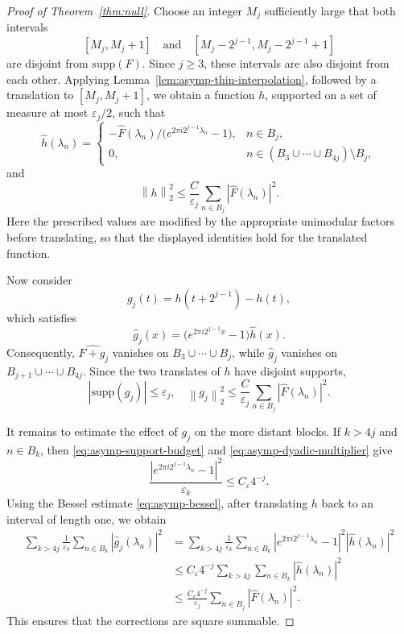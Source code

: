 \documentclass[10pt,a4paper]{amsart}
\newcommand{\norm}[1]{\left\lVert #1 \right\rVert}
\newcommand{\supp}{{\mathrm{supp}}}
\begin{document}
\begin{proof}[Proof of Theorem~\ref{thm:null}]
Choose an integer \(M_j\) sufficiently large that both intervals
\[
    [M_j,M_j+1]
    \quad\text{and}\quad
    [M_j-2^{j-1},M_j-2^{j-1}+1]
\]
are disjoint from \(\supp (F)\). Since \(j\ge3\), these intervals
are also disjoint from each other.
Applying Lemma~\ref{lem:asymp-thin-interpolation}, followed by a
translation to \([M_j,M_j+1]\), we obtain a function \(h\), supported
on a set of measure at most \(\varepsilon_j/2\), such that
\[
    \widehat h(\lambda_n)=
    \begin{cases}
        -\widehat F(\lambda_n)/
        \bigl(e^{2\pi i2^{j-1}\lambda_n}-1\bigr),
        &n\in B_j,\\[1mm]
        0,
        &n\in(B_3\cup\cdots\cup B_{4j})\setminus B_j,
    \end{cases}
\]
and
\[
    \norm{h}_2^2
    \leq\frac{C}{\varepsilon_j}
    \sum_{n\in B_j}|\widehat F(\lambda_n)|^2.
\]
Here the prescribed values are modified by the appropriate unimodular
factors before translating, so that the displayed identities hold for
the translated function.

Now consider
\[
    g_j(t)=h(t+2^{j-1})-h(t),
\]
which satisfies
\[
    \widehat g_j(x)
    =\bigl(e^{2\pi i2^{j-1}x}-1\bigr)\widehat h(x).
\]
Consequently, \(\widehat{F+g_j}\) vanishes on
\(B_3\cup\cdots\cup B_j\), while \(\widehat g_j\) vanishes on
\(B_{j+1}\cup\cdots\cup B_{4j}\). Since the two translates of \(h\)
have disjoint supports,
\begin{equation}\label{eq:asymp-one-block}
    |\supp (g_j)|\leq\varepsilon_j,
    \quad
    \norm{g_j}_2^2
    \leq\frac{C}{\varepsilon_j}
    \sum_{n\in B_j}|\widehat F(\lambda_n)|^2.
\end{equation}

It remains to estimate the effect of \(g_j\) on the more distant
blocks. If \(k>4j\) and \(n\in B_k\), then
\eqref{eq:asymp-support-budget} and
\eqref{eq:asymp-dyadic-multiplier} give
\[
    \frac{
        |e^{2\pi i2^{j-1}\lambda_n}-1|^2
    }{\varepsilon_k}
    \leq C_\varepsilon4^{-j}.
\]
Using the Bessel estimate \eqref{eq:asymp-bessel}, after translating
\(h\) back to an interval of length one, we obtain
\begin{equation}\label{eq:asymp-far-blocks}
\begin{aligned}
    \sum_{k>4j}\frac1{\varepsilon_k}
    \sum_{n\in B_k}|\widehat g_j(\lambda_n)|^2
    &=
    \sum_{k>4j}\frac1{\varepsilon_k}
    \sum_{n\in B_k}
    |e^{2\pi i2^{j-1}\lambda_n}-1|^2
    |\widehat h(\lambda_n)|^2\\
    &\leq
    C_\varepsilon4^{-j}
    \sum_{k>4j}\sum_{n\in B_k}
    |\widehat h(\lambda_n)|^2\\
    &\leq
    \frac{C_\varepsilon4^{-j}}{\varepsilon_j}
    \sum_{n\in B_j}|\widehat F(\lambda_n)|^2.
\end{aligned}
\end{equation}
This ensures that the corrections are square summable.
\medskip


\end{proof}
\end{document}
